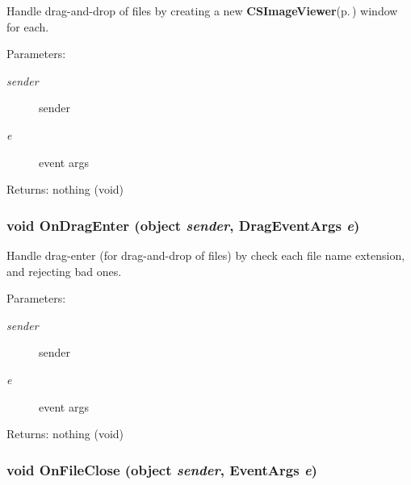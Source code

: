 Handle drag-and-drop of files by creating a new {\bf CSImage\-Viewer}{\rm (p.\,\pageref{class_c_s_image_viewer_1_1_c_s_image_viewer})} window for each. 

\begin{Desc}
\item[Parameters:]
\begin{description}
\item[{\em sender}]sender \item[{\em e}]event args \end{description}
\end{Desc}
\begin{Desc}
\item[Returns:]nothing (void) \end{Desc}
\subsubsection{\setlength{\rightskip}{0pt plus 5cm}void On\-Drag\-Enter (object {\em sender}, Drag\-Event\-Args {\em e})\hspace{0.3cm}{\tt  [private]}}\label{class_c_s_image_viewer_1_1_c_s_image_viewer_bbe1f3021f3a126f24f0ccee91e7d710}


Handle drag-enter (for drag-and-drop of files) by check each file name extension, and rejecting bad ones. 

\begin{Desc}
\item[Parameters:]
\begin{description}
\item[{\em sender}]sender \item[{\em e}]event args \end{description}
\end{Desc}
\begin{Desc}
\item[Returns:]nothing (void) \end{Desc}
\subsubsection{\setlength{\rightskip}{0pt plus 5cm}void On\-File\-Close (object {\em sender}, Event\-Args {\em e})\hspace{0.3cm}{\tt  [private]}}\label{class_c_s_image_viewer_1_1_c_s_image_viewer_15a46e4fe445ba9f7918053b30ee7b1e}


